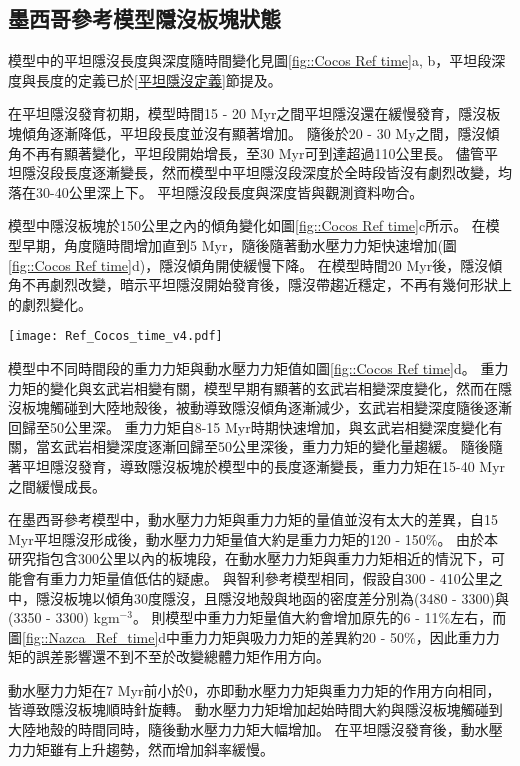 \newpage
\subsection{墨西哥參考模型隱沒板塊狀態}
模型中的平坦隱沒長度與深度隨時間變化見圖\ref{fig::Cocos Ref time}a, b，平坦段深度與長度的定義已於\ref{平坦隱沒定義}節提及。

在平坦隱沒發育初期，模型時間15 - 20 Myr之間平坦隱沒還在緩慢發育，隱沒板塊傾角逐漸降低，平坦段長度並沒有顯著增加。
隨後於20 - 30 My之間，隱沒傾角不再有顯著變化，平坦段開始增長，至30 Myr可到達超過110公里長。
儘管平坦隱沒段長度逐漸變長，然而模型中平坦隱沒段深度於全時段皆沒有劇烈改變，均落在30-40公里深上下。
平坦隱沒段長度與深度皆與觀測資料吻合。

模型中隱沒板塊於150公里之內的傾角變化如圖\ref{fig::Cocos Ref time}c所示。
在模型早期，角度隨時間增加直到5 Myr，隨後隨著動水壓力力矩快速增加(圖\ref{fig::Cocos Ref time}d)，隱沒傾角開使緩慢下降。
在模型時間20 Myr後，隱沒傾角不再劇烈改變，暗示平坦隱沒開始發育後，隱沒帶趨近穩定，不再有幾何形狀上的劇烈變化。

\begin{figure*}[hb]
    \centering
    \texttt{[image: Ref\_Cocos\_time\_v4.pdf]}
    \caption[墨西哥參考模型隱沒板塊狀態隨時間變化]{墨西哥參考模型隱沒板塊狀態隨時間變化。灰底為模型中之平坦隱沒時期。(a)參考模型平坦段長度隨時間變化(b)參考模型平坦段深度隨時間變化，灰虛線為\citealp{Manea2017}中提及之墨西哥平坦隱沒平坦段深度約落在35公里深。(c)粉紅線為參考模型隱沒板塊自海溝到深度150公里之傾角，黑線則為參考模型隱沒板塊自海溝到深度60公里之傾角。(d)參考模型中重力力矩與吸力力矩隨時間變化。其中粉紅色線為重力力矩，深藍色線為吸力力矩。兩者皆有做1 Myr的移動平均。灰虛線標示力矩0。}
    \label{fig::Cocos Ref time}
\end{figure*}

模型中不同時間段的重力力矩與動水壓力力矩值如圖\ref{fig::Cocos Ref time}d。
重力力矩的變化與玄武岩相變有關，模型早期有顯著的玄武岩相變深度變化，然而在隱沒板塊觸碰到大陸地殼後，被動導致隱沒傾角逐漸減少，玄武岩相變深度隨後逐漸回歸至50公里深。
重力力矩自8-15 Myr時期快速增加，與玄武岩相變深度變化有關，當玄武岩相變深度逐漸回歸至50公里深後，重力力矩的變化量趨緩。
隨後隨著平坦隱沒發育，導致隱沒板塊於模型中的長度逐漸變長，重力力矩在15-40 Myr之間緩慢成長。

在墨西哥參考模型中，動水壓力力矩與重力力矩的量值並沒有太大的差異，自15 Myr平坦隱沒形成後，動水壓力力矩量值大約是重力力矩的120 - 150$\%$。
由於本研究指包含300公里以內的板塊段，在動水壓力力矩與重力力矩相近的情況下，可能會有重力力矩量值低估的疑慮。
與智利參考模型相同，假設自300 - 410公里之中，隱沒板塊以傾角30度隱沒，且隱沒地殼與地函的密度差分別為(3480 - 3300)與(3350 - 3300) kgm$^{-3}$。
則模型中重力力矩量值大約會增加原先的6 - 11$\%$左右，而圖\ref{fig::Nazca_Ref_time}d中重力力矩與吸力力矩的差異約20 - 50$\%$，因此重力力矩的誤差影響還不到不至於改變總體力矩作用方向。

動水壓力力矩在7 Myr前小於0，亦即動水壓力力矩與重力力矩的作用方向相同，皆導致隱沒板塊順時針旋轉。
動水壓力力矩增加起始時間大約與隱沒板塊觸碰到大陸地殼的時間同時，隨後動水壓力力矩大幅增加。
在平坦隱沒發育後，動水壓力力矩雖有上升趨勢，然而增加斜率緩慢。
